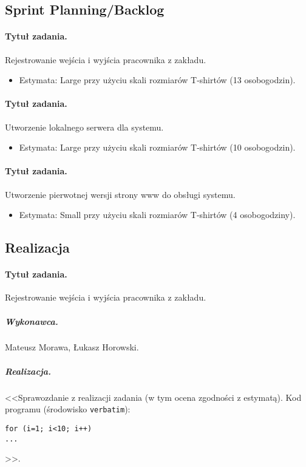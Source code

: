 \documentclass[a4paper]{article}
\begin{document}
\subsection{Sprint Planning/Backlog}

\paragraph{Tytuł zadania.} Rejestrowanie wejścia i wyjścia pracownika z zakładu.
\begin{itemize}
\item Estymata: Large przy użyciu skali rozmiarów T-shirtów (13 osobogodzin).
\end{itemize}

\paragraph{Tytuł zadania.} Utworzenie lokalnego serwera dla systemu.
\begin{itemize}
\item Estymata: Large przy użyciu skali rozmiarów T-shirtów (10 osobogodzin).
\end{itemize}

\paragraph{Tytuł zadania.} Utworzenie pierwotnej wersji strony www do obsługi systemu.
\begin{itemize}
\item Estymata: Small przy użyciu skali rozmiarów T-shirtów (4 osobogodziny).
\end{itemize}

\subsection{Realizacja}

\paragraph{Tytuł zadania.} Rejestrowanie wejścia i wyjścia pracownika z zakładu.
\subparagraph{Wykonawca.} Mateusz Morawa, Łukasz Horowski.
\subparagraph{Realizacja.} <<Sprawozdanie z realizacji zadania (w tym ocena zgodności z estymatą). Kod programu (środowisko \texttt{verbatim}): \begin{verbatim}
for (i=1; i<10; i++)
...
\end{verbatim}>>.
\end{document}
